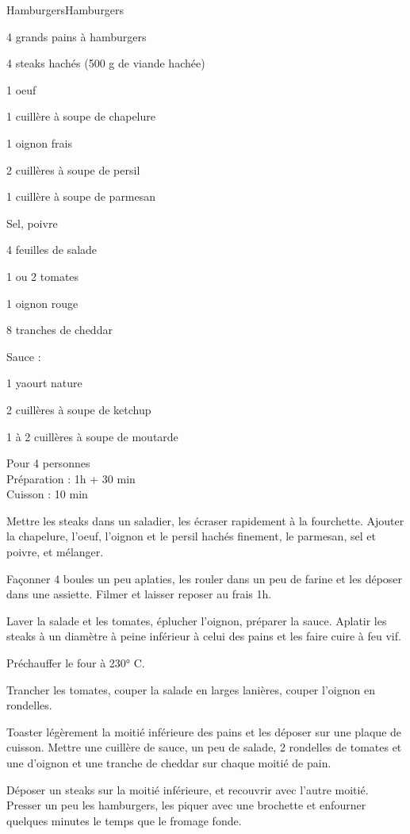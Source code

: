 \begin{recette}{Hamburgers}{Hamburgers}

\begin{ingredients}
4 grands pains à hamburgers\par
4 steaks hachés (500 g de viande hachée)\par
1 oeuf\par
1 cuillère à soupe de chapelure\par
1 oignon frais\par
2 cuillères à soupe de persil\par
1 cuillère à soupe de parmesan\par
Sel, poivre\par
4 feuilles de salade\par
1 ou 2 tomates\par
1 oignon rouge\par
8 tranches de cheddar\par
Sauce :\par
1 yaourt nature\par
2 cuillères à soupe de ketchup\par
1 à 2 cuillères à soupe de moutarde\par
\end{ingredients}

\begin{infos}
Pour 4 personnes\\
Préparation : 1h + 30 min\\
Cuisson : 10 min\\
\end{infos}

\begin{etapes}
\item Mettre les steaks dans un saladier, les écraser rapidement à la fourchette. Ajouter la chapelure, l'oeuf, l'oignon et le persil hachés finement, le parmesan, sel et poivre, et mélanger.
\item Façonner 4 boules un peu aplaties, les rouler dans un peu de farine et les déposer dans une assiette. Filmer et laisser reposer au frais 1h.
\item Laver la salade et les tomates, éplucher l'oignon, préparer la sauce. Aplatir les steaks à un diamètre à peine inférieur à celui des pains et les faire cuire à feu vif.
\item Préchauffer le four à 230° C.
\item Trancher les tomates, couper la salade en larges lanières, couper l'oignon en rondelles.
\item Toaster légèrement la moitié inférieure des pains et les déposer sur une plaque de cuisson. Mettre une cuillère de sauce, un peu de salade, 2 rondelles de tomates et une d'oignon et une tranche de cheddar sur chaque moitié de pain.
\item Déposer un steaks sur la moitié inférieure, et recouvrir avec l'autre moitié. Presser un peu les hamburgers, les piquer avec une brochette et enfourner quelques minutes le temps que le fromage fonde.
\end{etapes}


\end{recette}
